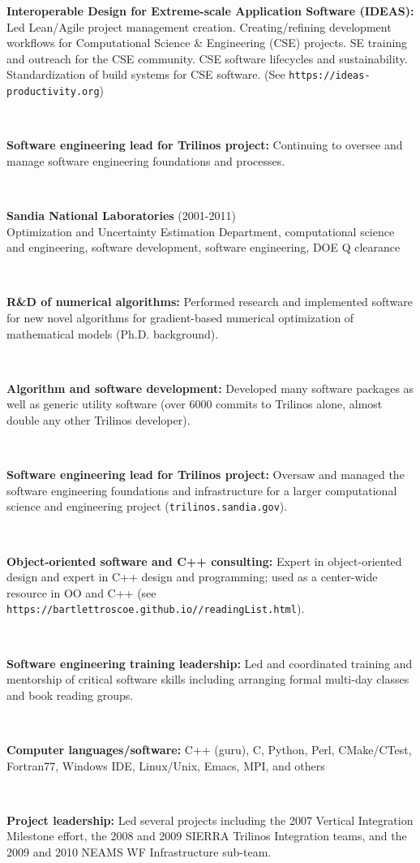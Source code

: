\documentclass{report}
\newcommand{\itemvs}{1ex}
\newcommand{\indentone}{0.5in}
\newcommand{\widthone}{6.4in}
\newcommand{\pboxone}{\hspace*{\indentone}\parbox[t]{\widthone}}
\newcommand{\indenttwo}{0.75in}
\newcommand{\widthtwo}{6.15in}
\newcommand{\pboxtwo}{\hspace*{\indenttwo}\parbox[t]{\widthtwo}}
\begin{document}
%
{}\pboxtwo{\textbf{Interoperable Design for Extreme-scale Application Software (IDEAS):} Led Lean/Agile project management creation. Creating/refining development workflows for Computational Science \& Engineering (CSE) projects. SE training and outreach for the CSE community. CSE software lifecycles and sustainability.  Standardization of build systems for CSE software.  (See \texttt{https://ideas-productivity.org})}
\\[\itemvs]
%
{}\pboxtwo{\textbf{Software engineering lead for Trilinos project:} Continuing to oversee and manage software engineering foundations and processes.}
\\[\itemvs]
%
{}\pboxone{\textbf{Sandia National Laboratories} (2001-2011)\\
Optimization and Uncertainty Estimation Department, computational science and engineering, software development, software engineering, DOE Q clearance} \\[\itemvs]
%
{}\pboxtwo{\textbf{R\&D of numerical algorithms:} Performed research and implemented software for new novel algorithms for gradient-based numerical optimization of mathematical models (Ph.D. background).} \\[\itemvs]
%
{}\pboxtwo{\textbf{Algorithm and software development:} Developed many software packages as well as generic utility software (over 6000 commits to Trilinos alone, almost double any other Trilinos developer).} \\[\itemvs]
%
{}\pboxtwo{\textbf{Software engineering lead for Trilinos project:} Oversaw and managed the software engineering foundations and infrastructure for a larger computational science and engineering project (\texttt{trilinos.sandia.gov}).} \\[\itemvs]
%
{}\pboxtwo{\textbf{Object-oriented software and C++ consulting:} Expert in object-oriented design and expert in C++ design and programming; used as a center-wide resource in OO and C++ (see {}\texttt{https://bartlettroscoe.github.io//readingList.html}).} \\[\itemvs]
%
{}\pboxtwo{\textbf{Software engineering training leadership:} Led and coordinated training and mentorship of critical software skills including arranging formal multi-day classes and book reading groups.} \\[\itemvs]
%
{}\pboxtwo{\textbf{Computer languages/software:} C++ (guru), C, Python, Perl, CMake/CTest, Fortran77, Windows IDE, Linux/Unix, Emacs, MPI, and others} \\[\itemvs]
%
{}\pboxtwo{\textbf{Project leadership:} Led several projects including the 2007 Vertical Integration Milestone effort, the 2008 and 2009 SIERRA Trilinos Integration teams, and the 2009 and 2010 NEAMS WF Infrastructure sub-team.} \\[\itemvs]
\end{document}
